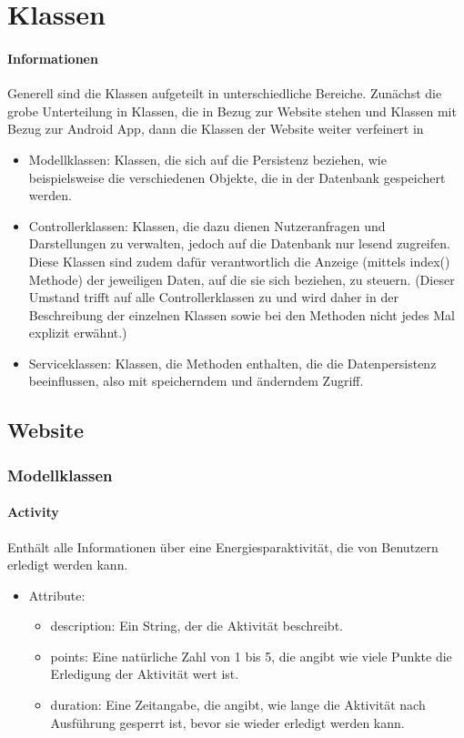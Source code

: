 \section{Klassen}
	\paragraph{Informationen}
	Generell sind die Klassen aufgeteilt in unterschiedliche Bereiche. Zun\"achst die grobe Unterteilung in Klassen, die in Bezug zur Website stehen und Klassen mit Bezug zur Android App, dann die Klassen der Website weiter verfeinert in
	\begin{itemize}
		\item Modellklassen: Klassen, die sich auf die Persistenz beziehen, wie beispielsweise die verschiedenen Objekte, die in der Datenbank gespeichert werden.
		\item Controllerklassen: Klassen, die dazu dienen Nutzeranfragen und Darstellungen zu verwalten, jedoch auf die Datenbank nur lesend zugreifen. Diese Klassen sind zudem daf\"ur verantwortlich die Anzeige (mittels index() Methode) der jeweiligen Daten, auf die sie sich beziehen, zu steuern. (Dieser Umstand trifft auf alle Controllerklassen zu und wird daher in der Beschreibung der einzelnen Klassen sowie bei den Methoden nicht jedes Mal explizit erw\"ahnt.)
		\item Serviceklassen: Klassen, die Methoden enthalten, die die Datenpersistenz beeinflussen, also mit speicherndem und \"anderndem Zugriff. 
	\end{itemize}
	
\subsection{Website}

\subsubsection{Modellklassen}
	\paragraph{Activity}Enth\"alt alle Informationen \"uber eine Energiesparaktivit\"at, die von Benutzern erledigt werden kann.
		\begin{itemize}
			\item Attribute:
				\begin{itemize}
					\item description: Ein String, der die Aktivit\"at beschreibt.
					\item points: Eine nat\"urliche Zahl von 1 bis 5, die angibt wie viele Punkte die Erledigung der Aktivit\"at wert ist.
					\item duration: Eine Zeitangabe, die angibt, wie lange die Aktivit\"at nach Ausf\"uhrung gesperrt ist, bevor sie wieder erledigt werden kann.
				\end{itemize}
		\end{itemize}
